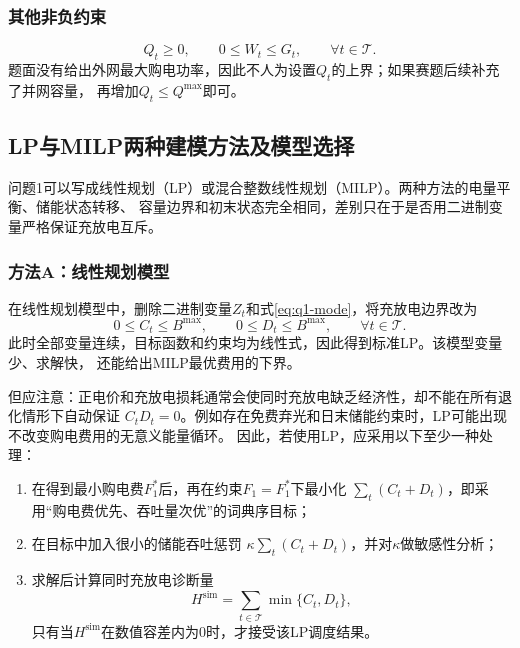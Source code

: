 \documentclass[UTF8,11pt]{ctexart}
\begin{document}
\subsubsection{其他非负约束}

\begin{equation}
    Q_t\geq0,\qquad 0\leq W_t\leq G_t,
    \qquad \forall t\in\mathcal{T}.
    \label{eq:q1-nonnegative}
\end{equation}
题面没有给出外网最大购电功率，因此不人为设置$Q_t$的上界；如果赛题后续补充了并网容量，
再增加$Q_t\leq Q^{\max}$即可。

\subsection{LP与MILP两种建模方法及模型选择}

问题1可以写成线性规划（LP）或混合整数线性规划（MILP）。两种方法的电量平衡、储能状态转移、
容量边界和初末状态完全相同，差别只在于是否用二进制变量严格保证充放电互斥。

\subsubsection{方法A：线性规划模型}

在线性规划模型中，删除二进制变量$Z_t$和式\eqref{eq:q1-mode}，将充放电边界改为
\begin{equation}
    0\leq C_t\leq B^{\max},\qquad
    0\leq D_t\leq B^{\max},
    \qquad \forall t\in\mathcal{T}.
    \label{eq:q1-lp-battery}
\end{equation}
此时全部变量连续，目标函数和约束均为线性式，因此得到标准LP。该模型变量少、求解快，
还能给出MILP最优费用的下界。

但应注意：正电价和充放电损耗通常会使同时充放电缺乏经济性，却不能在所有退化情形下自动保证
$C_tD_t=0$。例如存在免费弃光和日末储能约束时，LP可能出现不改变购电费用的无意义能量循环。
因此，若使用LP，应采用以下至少一种处理：
\begin{enumerate}[label=(\arabic*)]
    \item 在得到最小购电费$F_1^*$后，再在约束$F_1=F_1^*$下最小化
    $\sum_t(C_t+D_t)$，即采用“购电费优先、吞吐量次优”的词典序目标；
    \item 在目标中加入很小的储能吞吐惩罚
    $\kappa\sum_t(C_t+D_t)$，并对$\kappa$做敏感性分析；
    \item 求解后计算同时充放电诊断量
    \begin{equation}
        H^{\mathrm{sim}}=\sum_{t\in\mathcal{T}}\min\{C_t,D_t\},
    \end{equation}
    只有当$H^{\mathrm{sim}}$在数值容差内为0时，才接受该LP调度结果。
\end{enumerate}
\end{document}
